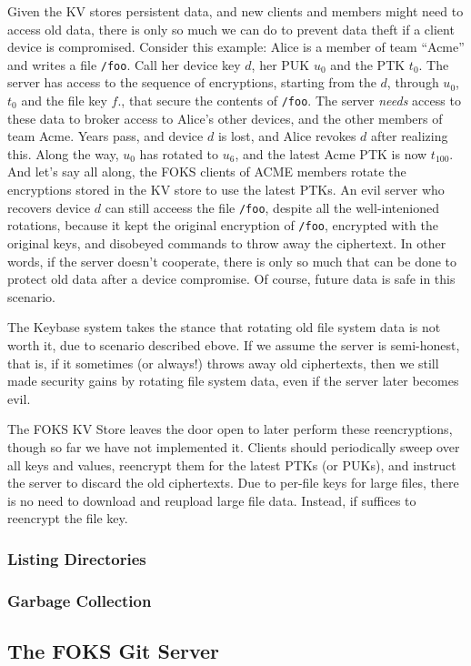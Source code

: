 Given the KV stores persistent data, and new clients and members might need to
access old data, there is only so much we can do to prevent data theft if a
client device is compromised.  Consider this example: Alice is a member of team
``Acme'' and writes a file \texttt{/foo}.  Call her device key $d$, her PUK
$u_0$ and the PTK $t_0$. The server has access to the sequence of encryptions,
starting from the $d$, through $u_0$, $t_0$ and the file key $f$., that secure the contents of
\texttt{/foo}. The server \textit{needs} access to these data to broker access
to Alice's other devices, and the other members of team Acme.
Years pass, and device $d$ is lost, and Alice revokes $d$ after
realizing this.  Along the way, $u_0$ has rotated to $u_6$, and the latest Acme
PTK is now $t_{100}$.  And let's say all along, the FOKS clients of ACME members
rotate the encryptions stored in the KV store to use the latest PTKs. An evil
server who recovers device $d$ can still acceess the file \texttt{/foo}, despite
all the well-intenioned rotations, because it kept the original encryption of
\texttt{/foo}, encrypted with the original keys, and disobeyed commands to throw
away the ciphertext. In other words, if the server doesn't cooperate, there is
only so much that can be done to protect old data after a device compromise.  Of
course, future data is safe in this scenario.

The Keybase system takes the stance that rotating old file system
data is not worth it, due to scenario described ebove. If we 
assume the server is semi-honest, that is, if it sometimes (or always!)
throws away old ciphertexts, then we still made
security gains by rotating file system data, even if the server later
becomes evil.

The FOKS KV Store leaves the door open to later perform these
reencryptions, though so far we have not implemented it.
Clients should periodically sweep over all keys and values,
reencrypt them for the latest PTKs (or PUKs), and instruct
the server to discard the old ciphertexts. Due to per-file
keys for large files, there is no need to download and reupload
large file data. Instead, if suffices to reencrypt the file key.

\subsubsection{Listing Directories}


\subsubsection{Garbage Collection}

\subsection{The FOKS Git Server}
